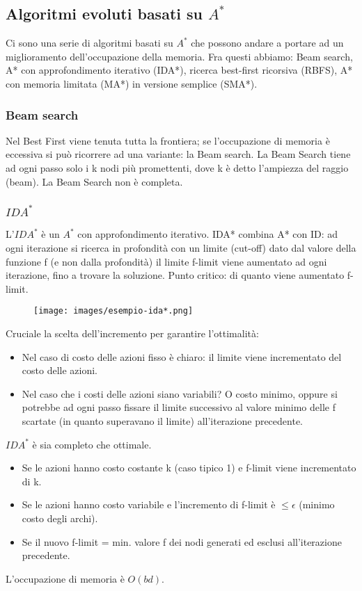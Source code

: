 \subsection{Algoritmi evoluti basati su $A^*$}
Ci sono una serie di algoritmi basati su $A^*$ che possono andare a portare ad un miglioramento dell'occupazione della memoria.
Fra questi abbiamo: Beam search, A* con approfondimento iterativo (IDA*), ricerca best-first ricorsiva (RBFS), A* con memoria limitata (MA*) in versione semplice (SMA*).

\subsubsection{Beam search}
Nel Best First viene tenuta tutta la frontiera; se l’occupazione di memoria è eccessiva si può ricorrere ad una variante: la Beam search.
La Beam Search tiene ad ogni passo solo i k nodi più promettenti, dove k è detto l’ampiezza del raggio
(beam). La Beam Search non è completa.

\subsubsection{$IDA^*$}
L'$IDA^*$ è un $A^*$ con approfondimento iterativo. IDA* combina A* con ID: ad ogni iterazione si ricerca
in profondità con un limite (cut-off) dato dal valore della funzione f (e non dalla profondità) il limite f-limit viene aumentato ad ogni iterazione,
fino a trovare la soluzione. Punto critico: di quanto viene aumentato f-limit.
\begin{example}
    \begin{figure}[h!]
        \centering
        \texttt{[image: images/esempio-ida*.png]}
    \end{figure}
\end{example}
\hspace{-15pt}Cruciale la scelta dell'incremento per garantire l’ottimalità:
\begin{itemize}
    \item Nel caso di costo delle azioni fisso è chiaro: il limite viene incrementato del costo delle azioni.
    \item Nel caso che i costi delle azioni siano variabili? O costo minimo, oppure si potrebbe ad ogni passo fissare il limite successivo al
    valore minimo delle f scartate (in quanto superavano il limite) all’iterazione precedente.
\end{itemize}
$IDA^*$ è sia completo che ottimale.
\begin{itemize}
    \item Se le azioni hanno costo costante k (caso tipico 1) e f-limit viene incrementato di k.
    \item Se le azioni hanno costo variabile e l'incremento di f-limit è $\leq \epsilon$ (minimo costo degli archi).
    \item Se il nuovo f-limit = min. valore f dei nodi generati ed esclusi all'iterazione precedente.
\end{itemize}
L'occupazione di memoria è $O(bd)$.

